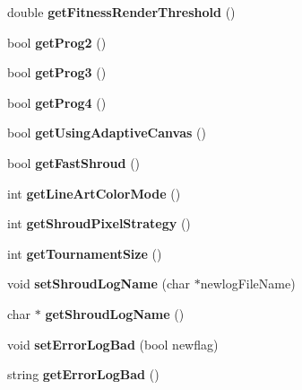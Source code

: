 \begin{DoxyCompactItemize}
\item 
\hypertarget{classConfigReader_a813f80a6afee19bdfd1787db5c277676}{}\label{classConfigReader_a813f80a6afee19bdfd1787db5c277676} 
double {\bfseries get\+Fitness\+Render\+Threshold} ()
\item 
\hypertarget{classConfigReader_abe4991a967a948f5bfa7d61eca9e26c2}{}\label{classConfigReader_abe4991a967a948f5bfa7d61eca9e26c2} 
bool {\bfseries get\+Prog2} ()
\item 
\hypertarget{classConfigReader_a15c4ba819559d15420c43c40b455972a}{}\label{classConfigReader_a15c4ba819559d15420c43c40b455972a} 
bool {\bfseries get\+Prog3} ()
\item 
\hypertarget{classConfigReader_a73b004a202d836b0f5947675529dbb4c}{}\label{classConfigReader_a73b004a202d836b0f5947675529dbb4c} 
bool {\bfseries get\+Prog4} ()
\item 
\hypertarget{classConfigReader_ac33a1ec754771eb38d945e312493fc70}{}\label{classConfigReader_ac33a1ec754771eb38d945e312493fc70} 
bool {\bfseries get\+Using\+Adaptive\+Canvas} ()
\item 
\hypertarget{classConfigReader_ad2722e1f259e6a4e46b5dc0166fdf80d}{}\label{classConfigReader_ad2722e1f259e6a4e46b5dc0166fdf80d} 
bool {\bfseries get\+Fast\+Shroud} ()
\item 
\hypertarget{classConfigReader_a16ec9fa2175b2c7f28253ca3ec05c2da}{}\label{classConfigReader_a16ec9fa2175b2c7f28253ca3ec05c2da} 
int {\bfseries get\+Line\+Art\+Color\+Mode} ()
\item 
\hypertarget{classConfigReader_a8b50213030f7964d77e8989f8ee6c5e4}{}\label{classConfigReader_a8b50213030f7964d77e8989f8ee6c5e4} 
int {\bfseries get\+Shroud\+Pixel\+Strategy} ()
\item 
\hypertarget{classConfigReader_ac48c38cb4fd2d04c7761b4813d94cd90}{}\label{classConfigReader_ac48c38cb4fd2d04c7761b4813d94cd90} 
int {\bfseries get\+Tournament\+Size} ()
\item 
\hypertarget{classConfigReader_aaf1d7c03b3b4b3e71e12e6161b09db34}{}\label{classConfigReader_aaf1d7c03b3b4b3e71e12e6161b09db34} 
void {\bfseries set\+Shroud\+Log\+Name} (char $\ast$newlog\+File\+Name)
\item 
\hypertarget{classConfigReader_ac5df2afab92273c5a69c61fb8ffc9355}{}\label{classConfigReader_ac5df2afab92273c5a69c61fb8ffc9355} 
char $\ast$ {\bfseries get\+Shroud\+Log\+Name} ()
\item 
\hypertarget{classConfigReader_a7bf5f509fd6103cf351c384ddde32149}{}\label{classConfigReader_a7bf5f509fd6103cf351c384ddde32149} 
void {\bfseries set\+Error\+Log\+Bad} (bool newflag)
\item 
\hypertarget{classConfigReader_a5b5baa8c5865fd75f87d3fe69dc2f814}{}\label{classConfigReader_a5b5baa8c5865fd75f87d3fe69dc2f814} 
string {\bfseries get\+Error\+Log\+Bad} ()
\end{DoxyCompactItemize}
